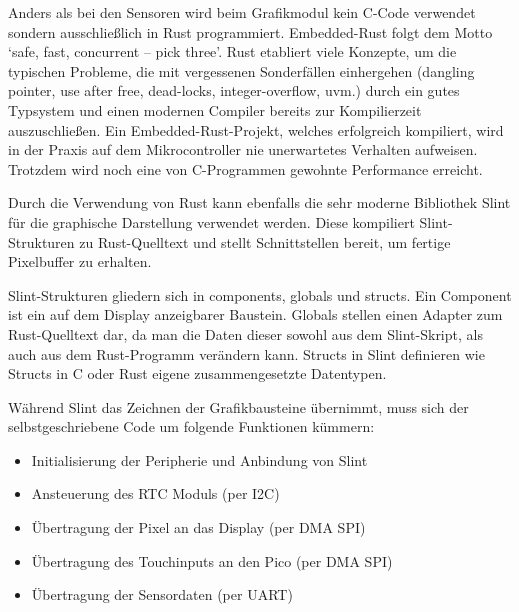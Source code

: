 \documentclass[a4paper,11pt]{article}
\begin{document}
\vspace{0.3cm}
\noindent
Anders als bei den Sensoren wird beim Grafikmodul kein C-Code verwendet sondern ausschließlich in Rust programmiert.
Embedded-Rust folgt dem Motto \textquoteleft safe, fast, concurrent – pick three\textquoteright.
Rust etabliert viele Konzepte, um die typischen Probleme, die mit vergessenen Sonderfällen einhergehen (dangling pointer, use after free, dead-locks, integer-overflow, uvm.) durch ein gutes Typsystem und einen modernen Compiler bereits zur Kompilierzeit auszuschließen.
Ein Embedded-Rust-Projekt, welches erfolgreich kompiliert, wird in der Praxis auf dem Mikrocontroller nie unerwartetes Verhalten aufweisen.
Trotzdem wird noch eine von C-Programmen gewohnte Performance erreicht.

\vspace{0.3cm}
\noindent
Durch die Verwendung von Rust kann ebenfalls die sehr moderne Bibliothek Slint für die graphische Darstellung verwendet werden. Diese kompiliert Slint-Strukturen zu Rust-Quelltext und stellt Schnittstellen bereit, um fertige Pixelbuffer zu erhalten.

\vspace{0.3cm}
\noindent
Slint-Strukturen gliedern sich in components, globals und structs.
Ein Component ist ein auf dem Display anzeigbarer Baustein.
Globals stellen einen Adapter zum Rust-Quelltext dar, da man die Daten dieser sowohl aus dem Slint-Skript, als auch aus dem Rust-Programm verändern kann.
Structs in Slint definieren wie Structs in C oder Rust eigene zusammengesetzte Datentypen.



\vspace{0.3cm}
\noindent
Während Slint das Zeichnen der Grafikbausteine übernimmt, muss sich der selbstgeschriebene Code um folgende Funktionen kümmern:
\begin{itemize}
	\item Initialisierung der Peripherie und Anbindung von Slint
	\item Ansteuerung des RTC Moduls (per I2C)
	\item Übertragung der Pixel an das Display (per DMA SPI)
	\item Übertragung des Touchinputs an den Pico (per DMA SPI)
	\item Übertragung der Sensordaten (per UART)
\end{itemize}
\end{document}
